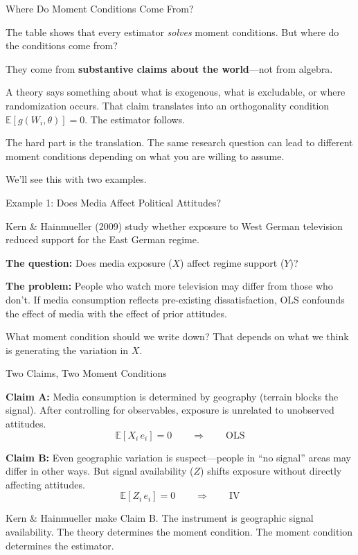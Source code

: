 \documentclass[aspectratio=169, handout, t]{beamer}
\numberwithin{equation}{section}
\begin{document}
\begin{frame}{Where Do Moment Conditions Come From?}

The table shows that every estimator \emph{solves} moment conditions.  But where do the conditions come from?

\medskip\pause
They come from \textbf{substantive claims about the world}---not from algebra.

\medskip\pause
A theory says something about what is exogenous, what is excludable, or where randomization occurs.  That claim translates into an orthogonality condition $\mathbb{E}[g(W_i,\theta)]=0$.  The estimator follows.

\medskip\pause
\alert{The hard part is the translation.}  The same research question can lead to different moment conditions depending on what you are willing to assume.

\medskip
We'll see this with two examples.

\end{frame}

\begin{frame}{Example 1: Does Media Affect Political Attitudes?}

Kern \& Hainmueller (2009) study whether exposure to West German television reduced support for the East German regime.

\medskip\pause
\textbf{The question:} Does media exposure ($X$) affect regime support ($Y$)?

\medskip\pause
\textbf{The problem:} People who watch more television may differ from those who don't.  If media consumption reflects pre-existing dissatisfaction, OLS confounds the effect of media with the effect of prior attitudes.

\medskip\pause
What moment condition should we write down?  That depends on what we think is generating the variation in $X$.

\end{frame}

\begin{frame}{Two Claims, Two Moment Conditions}

\textbf{Claim A:} Media consumption is determined by geography (terrain blocks the signal).  After controlling for observables, exposure is unrelated to unobserved attitudes.
$$\mathbb{E}[X_i \, e_i] = 0 \qquad \Longrightarrow \qquad \text{OLS}$$

\pause
\textbf{Claim B:} Even geographic variation is suspect---people in ``no signal'' areas may differ in other ways.  But signal availability ($Z$) shifts exposure without directly affecting attitudes.
$$\mathbb{E}[Z_i \, e_i] = 0 \qquad \Longrightarrow \qquad \text{IV}$$

\pause
Kern \& Hainmueller make Claim B.  The instrument is geographic signal availability.  \alert{The theory determines the moment condition.  The moment condition determines the estimator.}

\end{frame}
\end{document}
